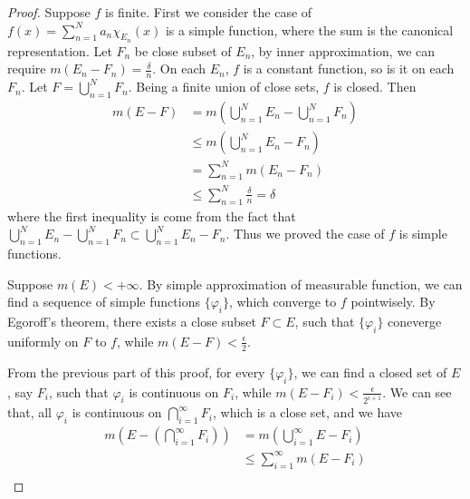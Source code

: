 \documentclass[lang=en, 12pt]{elegantbook}
\begin{document}
            \begin{proof}
                Suppose $f$ is finite. First we consider the case of $f(x) = \sum_{n=1}^{N} a_n \chi_{E_n}(x)$ is a simple function,
            where the sum is the canonical representation. 
            Let $F_n$ be close subset of $E_n$, by inner approximation, we can require $m(E_n-F_n) = \frac{\delta}{n}$. On each $E_n$,
            $f$ is a constant function, so is it on each $F_n$. Let $F = \bigcup_{n=1}^{N} F_n$. Being a finite union of close sets, $f$
            is closed. Then
                \begin{equation*}
                    \begin{aligned}
                        m(E-F) &= m(\bigcup_{n=1}^{N} E_n - \bigcup_{n=1}^{N} F_n)\\
                        &\leq m(\bigcup_{n=1}^{N} E_n - F_n)\\
                        &= \sum_{n=1}^{N} m(E_n - F_n)\\
                        &\leq \sum_{n=1}^{N} \frac{\delta}{n} = \delta
                    \end{aligned}
                \end{equation*}
            where the first inequality is come from the fact that $\bigcup_{n=1}^{N} E_n - \bigcup_{n=1}^{N} F_n \subset \bigcup_{n=1}^{N} E_n - F_n $.
            Thus we proved the case of $f$ is simple functions. \par
                Suppose $m(E)<+\infty$. By simple approximation of measurable function, we can find a sequence of simple functions $\{\varphi_i\}$,
            which converge to $f$ pointwisely. By Egoroff's theorem, there exists a close subset $F \subset E$, such that $\{\varphi_i\}$ coneverge 
            uniformly on $F$ to $f$, while $m(E-F) < \frac{\epsilon}{2}$. \par
                From the previous part of this proof, for every $\{\varphi_i\}$, we can find a closed set of $E$, say $F_i$, 
            such that $\varphi_i$ is continuous on $F_i$, while $m(E-F_i) < \frac{\epsilon}{2^{i+1}}$. We can see that, all $\varphi_i$
            is continuous on $\bigcap_{i=1}^{\infty} F_i$, which is a close set, and we have 
            \begin{equation*}
                \begin{aligned}
                    m(E - (\bigcap_{i=1}^{\infty} F_i)) &= m(\bigcup_{i=1}^{\infty} E - F_i)\\
                    &\leq \sum_{i=1}^{\infty} m(E - F_i)\\

\end{aligned}
\end{equation*}
\end{proof}
\end{document}
